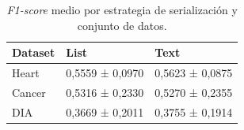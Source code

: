 \begin{table}[htbp]
\centering
\caption[F1-score medio por estrategia de serialización y conjunto de datos]{\textit{F1-score} medio por estrategia de serialización y conjunto de datos.}
\label{tab:f1_serializacion}
\begin{tabular}{lll}
\toprule
Dataset & List & Text \\
\midrule
Heart & 0{,}5559 ± 0{,}0970 & 0{,}5623 ± 0{,}0875 \\
Cancer & 0{,}5316 ± 0{,}2330 & 0{,}5270 ± 0{,}2355 \\
DIA & 0{,}3669 ± 0{,}2011 & 0{,}3755 ± 0{,}1914 \\
\bottomrule
\end{tabular}
\end{table}
